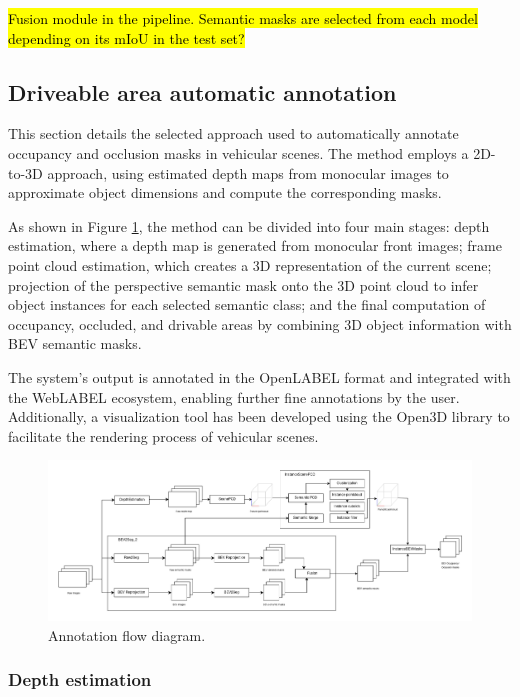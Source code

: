 \hl{Fusion module in the pipeline. Semantic masks are selected from each model depending on its mIoU in the test set?}


\subsection{Driveable area automatic annotation}
\label{aplication}

This section details the selected approach used to automatically annotate occupancy and occlusion masks in vehicular scenes. The method employs a 2D-to-3D approach, using estimated depth maps from monocular images to approximate object dimensions and compute the corresponding masks.

As shown in Figure \ref{fig:application_flow_diagram}, the method can be divided into four main stages: depth estimation, where a depth map is generated from monocular front images; frame point cloud estimation, which creates a 3D representation of the current scene; projection of the perspective semantic mask onto the 3D point cloud to infer object instances for each selected semantic class; and the final computation of occupancy, occluded, and drivable areas by combining 3D object information with BEV semantic masks.

The system's output is annotated in the OpenLABEL format and integrated with the WebLABEL \cite{weblabel} ecosystem, enabling further fine annotations by the user. Additionally, a visualization tool has been developed using the Open3D \cite{open3d} library to facilitate the rendering process of vehicular scenes.

\begin{figure}[h!]
    \centering
    \includegraphics[width=\linewidth]{images/metodology/Application_flow_diagram.png}
    \caption{Annotation flow diagram.}
    \label{fig:application_flow_diagram}
\end{figure}

\subsubsection{Depth estimation}
\label{depth_estimation}


